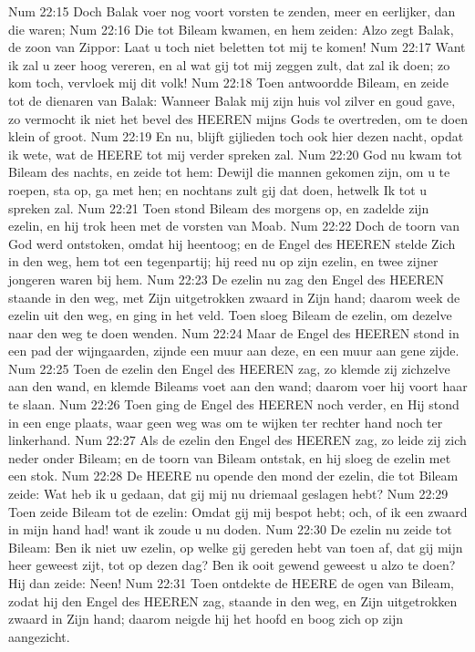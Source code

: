 Num 22:15  Doch Balak voer nog voort vorsten te zenden, meer en eerlijker, dan die waren;
Num 22:16  Die tot Bileam kwamen, en hem zeiden: Alzo zegt Balak, de zoon van Zippor: Laat u toch niet beletten tot mij te komen!
Num 22:17  Want ik zal u zeer hoog vereren, en al wat gij tot mij zeggen zult, dat zal ik doen; zo kom toch, vervloek mij dit volk!
Num 22:18  Toen antwoordde Bileam, en zeide tot de dienaren van Balak: Wanneer Balak mij zijn huis vol zilver en goud gave, zo vermocht ik niet het bevel des HEEREN mijns Gods te overtreden, om te doen klein of groot.
Num 22:19  En nu, blijft gijlieden toch ook hier dezen nacht, opdat ik wete, wat de HEERE tot mij verder spreken zal.
Num 22:20  God nu kwam tot Bileam des nachts, en zeide tot hem: Dewijl die mannen gekomen zijn, om u te roepen, sta op, ga met hen; en nochtans zult gij dat doen, hetwelk Ik tot u spreken zal.
Num 22:21  Toen stond Bileam des morgens op, en zadelde zijn ezelin, en hij trok heen met de vorsten van Moab.
Num 22:22  Doch de toorn van God werd ontstoken, omdat hij heentoog; en de Engel des HEEREN stelde Zich in den weg, hem tot een tegenpartij; hij reed nu op zijn ezelin, en twee zijner jongeren waren bij hem.
Num 22:23  De ezelin nu zag den Engel des HEEREN staande in den weg, met Zijn uitgetrokken zwaard in Zijn hand; daarom week de ezelin uit den weg, en ging in het veld. Toen sloeg Bileam de ezelin, om dezelve naar den weg te doen wenden.
Num 22:24  Maar de Engel des HEEREN stond in een pad der wijngaarden, zijnde een muur aan deze, en een muur aan gene zijde.
Num 22:25  Toen de ezelin den Engel des HEEREN zag, zo klemde zij zichzelve aan den wand, en klemde Bileams voet aan den wand; daarom voer hij voort haar te slaan.
Num 22:26  Toen ging de Engel des HEEREN noch verder, en Hij stond in een enge plaats, waar geen weg was om te wijken ter rechter hand noch ter linkerhand.
Num 22:27  Als de ezelin den Engel des HEEREN zag, zo leide zij zich neder onder Bileam; en de toorn van Bileam ontstak, en hij sloeg de ezelin met een stok.
Num 22:28  De HEERE nu opende den mond der ezelin, die tot Bileam zeide: Wat heb ik u gedaan, dat gij mij nu driemaal geslagen hebt?
Num 22:29  Toen zeide Bileam tot de ezelin: Omdat gij mij bespot hebt; och, of ik een zwaard in mijn hand had! want ik zoude u nu doden.
Num 22:30  De ezelin nu zeide tot Bileam: Ben ik niet uw ezelin, op welke gij gereden hebt van toen af, dat gij mijn heer geweest zijt, tot op dezen dag? Ben ik ooit gewend geweest u alzo te doen? Hij dan zeide: Neen!
Num 22:31  Toen ontdekte de HEERE de ogen van Bileam, zodat hij den Engel des HEEREN zag, staande in den weg, en Zijn uitgetrokken zwaard in Zijn hand; daarom neigde hij het hoofd en boog zich op zijn aangezicht.
